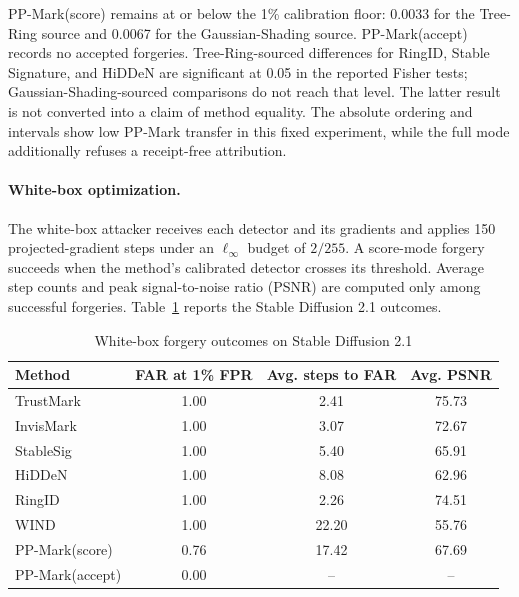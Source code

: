 PP-Mark(score) remains at or below the 1\% calibration floor: 0.0033 for the
Tree-Ring source and 0.0067 for the Gaussian-Shading source.  PP-Mark(accept)
records no accepted forgeries.  Tree-Ring-sourced differences for RingID, Stable
Signature, and HiDDeN are significant at 0.05 in the reported Fisher tests;
Gaussian-Shading-sourced comparisons do not reach that level.  The latter result
is not converted into a claim of method equality.  The absolute ordering and
intervals show low PP-Mark transfer in this fixed experiment, while the full mode
additionally refuses a receipt-free attribution.

\paragraph{White-box optimization.}
The white-box attacker receives each detector and its gradients and applies 150
projected-gradient steps under an \(\ell_\infty\) budget of
\(2/255\).  A score-mode forgery succeeds when the method's calibrated detector
crosses its threshold.  Average step counts and peak signal-to-noise ratio (PSNR)
are computed only among successful forgeries.  Table~\ref{tab:ch4-whitebox}
reports the Stable Diffusion 2.1 outcomes.

\begin{table}[H]
    \centering
    \caption{White-box forgery outcomes on Stable Diffusion 2.1}
    \label{tab:ch4-whitebox}
    \small
    \setlength{\tabcolsep}{8pt}
    \renewcommand{\arraystretch}{1.13}
    \begin{tabular}{@{}lccc@{}}
        \toprule
        Method & FAR at 1\% FPR & Avg. steps to FAR & Avg. PSNR \\
        \midrule
        TrustMark       & 1.00 &  2.41 & 75.73 \\
        InvisMark       & 1.00 &  3.07 & 72.67 \\
        StableSig       & 1.00 &  5.40 & 65.91 \\
        HiDDeN          & 1.00 &  8.08 & 62.96 \\
        RingID          & 1.00 &  2.26 & 74.51 \\
        WIND            & 1.00 & 22.20 & 55.76 \\
        PP-Mark(score)  & 0.76 & 17.42 & 67.69 \\
        PP-Mark(accept) & 0.00 &    -- &    -- \\
        \bottomrule
    \end{tabular}
\end{table}

